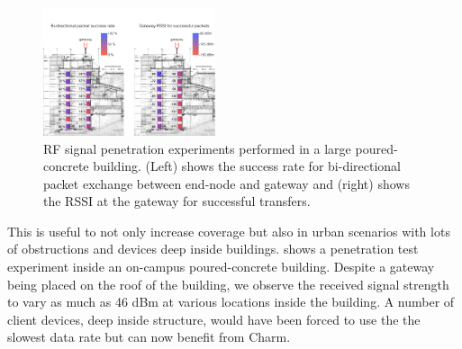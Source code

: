 \begin{figure}[!ht]
\centering
\includegraphics[width=0.45\textwidth]{figures/penetration_test_wean_cropped}
\compactimg
\caption{RF signal penetration experiments performed in a large poured-concrete building. (Left) shows the success rate for bi-directional packet exchange between end-node and gateway and (right) shows the RSSI at the gateway for successful transfers.}
\label{fig:penetration-test}
\end{figure}

This is useful to not only increase coverage but also in urban scenarios with lots of obstructions and devices deep inside buildings.  shows a penetration test experiment inside an on-campus poured-concrete building. Despite a gateway being placed on the roof of the building, we observe the received signal strength to vary as much as 46 dBm at various locations inside the building. A number of client devices, deep inside structure, would have been forced to use the the slowest data rate but can now benefit from Charm.